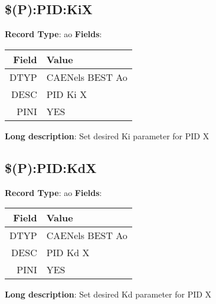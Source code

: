 \subsection{\$(P):PID:KiX}
\textbf{Record Type}: ao \newline \newline 
\textbf{Fields}: \newline 
\begin{tabularx}{0.7\linewidth}{|r|X|}
\hline Field & Value \\
\hline
\hline
DTYP & CAENels BEST Ao\\
\hline
DESC & PID Ki X\\
\hline
PINI & YES\\
\hline
\end{tabularx}
\newline \newline \newline
\textbf{Long description}: \newline 
 Set desired Ki parameter for PID X
\newline \newline

\subsection{\$(P):PID:KdX}
\textbf{Record Type}: ao \newline \newline 
\textbf{Fields}: \newline 
\begin{tabularx}{0.7\linewidth}{|r|X|}
\hline Field & Value \\
\hline
\hline
DTYP & CAENels BEST Ao\\
\hline
DESC & PID Kd X\\
\hline
PINI & YES\\
\hline
\end{tabularx}
\newline \newline \newline
\textbf{Long description}: \newline 
 Set desired Kd parameter for PID X
\newline \newline

